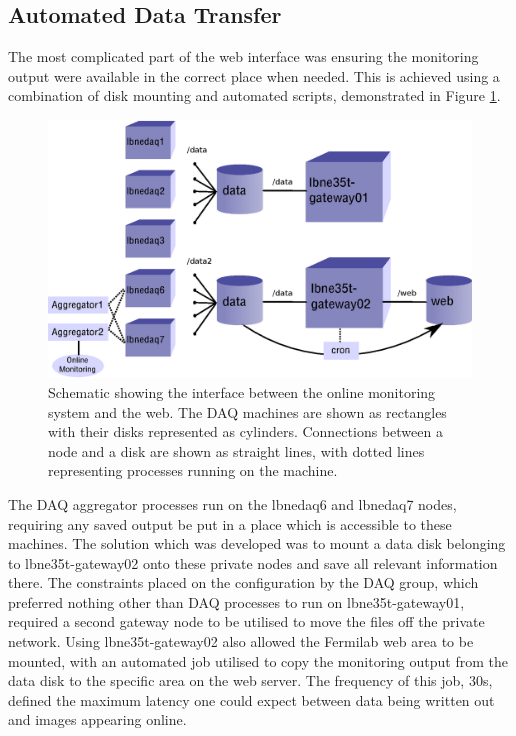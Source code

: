 \subsection{Automated Data Transfer}\label{sec:AutomatedDataTransfer}

The most complicated part of the web interface was ensuring the monitoring output were available in the correct place when needed.  This is achieved using a combination of disk mounting and automated scripts, demonstrated in Figure \ref{fig:WebInterface}.

\begin{figure}[ht]
  \centering
  \includegraphics[width=12cm]{webInterface.eps}
  \caption[Schematic showing the interface between the online monitoring system and the web]{Schematic showing the interface between the online monitoring system and the web.  The DAQ machines are shown as rectangles with their disks represented as cylinders.  Connections between a node and a disk are shown as straight lines, with dotted lines representing processes running on the machine.}
  \label{fig:WebInterface}
\end{figure}

The DAQ aggregator processes run on the lbnedaq6 and lbnedaq7 nodes, requiring any saved output be put in a place which is accessible to these machines.  The solution which was developed was to mount a data disk belonging to lbne35t-gateway02 onto these private nodes and save all relevant information there.  The constraints placed on the configuration by the DAQ group, which preferred nothing other than DAQ processes to run on lbne35t-gateway01, required a second gateway node to be utilised to move the files off the private network.  Using lbne35t-gateway02 also allowed the Fermilab web area to be mounted, with an automated job utilised to copy the monitoring output from the data disk to the specific area on the web server.  The frequency of this job, 30s, defined the maximum latency one could expect between data being written out and images appearing online.

